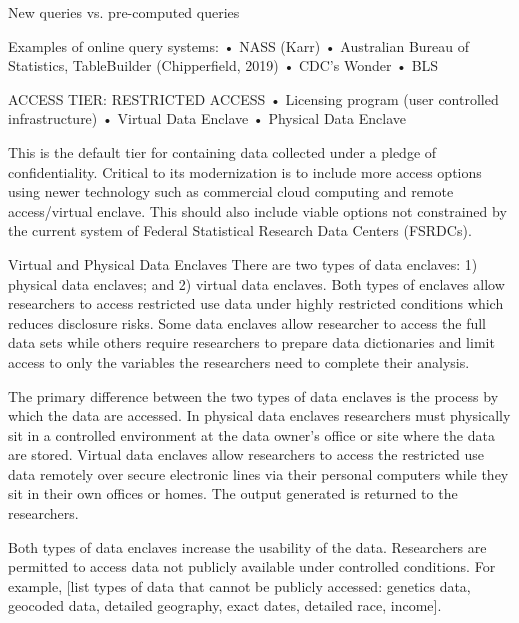 \documentclass[12pt]{article}
\begin{document}
New queries vs. pre-computed queries 

Examples of online query systems: 
•	NASS (Karr)
•	Australian Bureau of Statistics, TableBuilder (Chipperfield, 2019)
•	CDC’s Wonder
•	BLS 
 

ACCESS TIER: RESTRICTED ACCESS
• Licensing program (user controlled infrastructure)
• Virtual Data Enclave
• Physical Data Enclave

This is the default tier for containing data collected under a pledge of confidentiality. Critical to its modernization is to include more access options using newer technology such as commercial cloud computing and remote access/virtual enclave. This should also include viable options not constrained by the current system of Federal Statistical Research Data Centers (FSRDCs).

Virtual and Physical Data Enclaves 
There are two types of data enclaves: 1) physical data enclaves; and 2) virtual data enclaves. Both types of enclaves allow researchers to access restricted use data under highly restricted conditions which reduces disclosure risks. Some data enclaves allow researcher to access the full data sets while others require researchers to prepare data dictionaries and limit access to only the variables the researchers need to complete their analysis. 

The primary difference between the two types of data enclaves is the process by which the data are accessed. In physical data enclaves researchers must physically sit in a controlled environment at the data owner’s office or site where the data are stored. Virtual data enclaves allow researchers to access the restricted use data remotely over secure electronic lines via their personal computers while they sit in their own offices or homes. The output generated is returned to the researchers.

Both types of data enclaves increase the usability of the data. Researchers are permitted to access data not publicly available under controlled conditions. For example, [list types of data that cannot be publicly accessed: genetics data, geocoded data, detailed geography, exact dates, detailed race, income]. 
\end{document}
